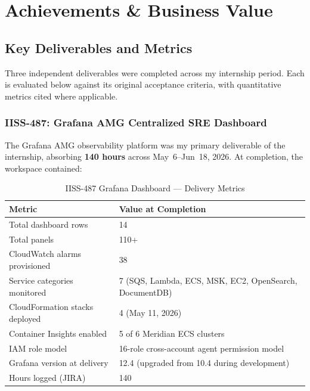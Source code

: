 
\chapter{Achievements \& Business Value}
\label{chap:achievements}

\section{Key Deliverables and Metrics}
\label{sec:key_deliverables}

Three independent deliverables were completed across my internship period.
Each is evaluated below against its original acceptance criteria, with
quantitative metrics cited where applicable.

\subsection{IISS-487: Grafana AMG Centralized SRE Dashboard}

The Grafana AMG observability platform was my primary deliverable of the
internship, absorbing \textbf{140 hours} across May~6--Jun~18, 2026. At
completion, the workspace contained:

\begin{table}[ht]
\centering
\caption{IISS-487 Grafana Dashboard --- Delivery Metrics}
\label{tab:iiss487_metrics}
\begin{tabular}{p{6.5cm}p{5.5cm}}
\toprule
\textbf{Metric} & \textbf{Value at Completion} \\
\midrule
Total dashboard rows & 14 \\
Total panels & 110+ \\
CloudWatch alarms provisioned & 38 \\
Service categories monitored & 7 (SQS, Lambda, ECS, MSK, EC2, OpenSearch, DocumentDB) \\
CloudFormation stacks deployed & 4 (May 11, 2026) \\
Container Insights enabled & 5 of 6 Meridian ECS clusters \\
IAM role model & 16-role cross-account agent permission model \\
Grafana version at delivery & 12.4 (upgraded from 10.4 during development) \\
Hours logged (JIRA) & 140 \\
\bottomrule
\end{tabular}
\end{table}

